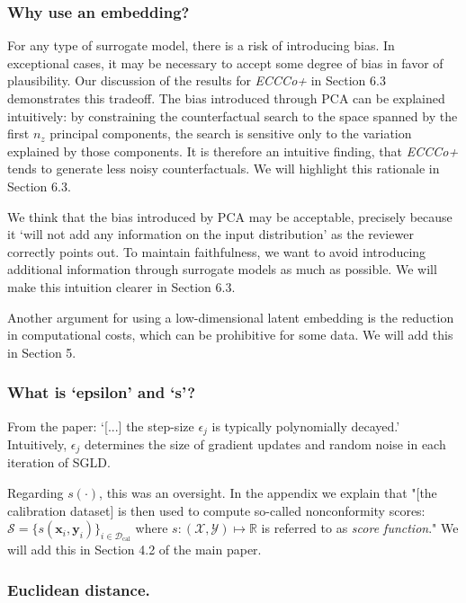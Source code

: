 \documentclass[letterpaper]{article} %
\begin{document}
\subsubsection{Why use an embedding?}

For any type of surrogate model, there is a risk of introducing bias. In exceptional cases, it may be necessary to accept some degree of bias in favor of plausibility. Our discussion of the results for \textit{ECCCo+} in Section 6.3 demonstrates this tradeoff. The bias introduced through PCA can be explained intuitively: by constraining the counterfactual search to the space spanned by the first $n_z$ principal components, the search is sensitive only to the variation explained by those components. It is therefore an intuitive finding, that \textit{ECCCo+} tends to generate less noisy counterfactuals. We will highlight this rationale in Section 6.3.

We think that the bias introduced by PCA may be acceptable, precisely because it `will not add any information on the input distribution' as the reviewer correctly points out. To maintain faithfulness, we want to avoid introducing additional information through surrogate models as much as possible. We will make this intuition clearer in Section 6.3.

Another argument for using a low-dimensional latent embedding is the reduction in computational costs, which can be prohibitive for some data. We will add this in Section 5. 

\subsubsection{What is `epsilon' and `s'?}

From the paper: `[...] the step-size $\epsilon_j$ is typically polynomially decayed.' Intuitively, $\epsilon_j$ determines the size of gradient updates and random noise in each iteration of SGLD.

Regarding $s(\cdot)$, this was an oversight. In the appendix we explain that "[the calibration dataset] is then used to compute so-called nonconformity scores: $\mathcal{S}=\{s(\mathbf{x}_i,\mathbf{y}_i)\}_{i \in \mathcal{D}_{\text{cal}}}$ where $s: (\mathcal{X},\mathcal{Y}) \mapsto \mathbb{R}$ is referred to as \textit{score function}." We will add this in Section 4.2 of the main paper. 

\subsubsection{Euclidean distance.}
\end{document}
